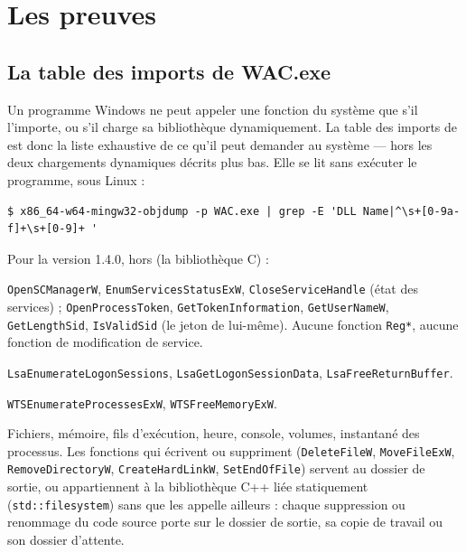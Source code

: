 \documentclass[11pt,a4paper,oneside]{report}
\begin{document}
\chapter{Les preuves}\label{ch:preuves}

\section{La table des imports de WAC.exe}

Un programme Windows ne peut appeler une fonction du système que s'il
l'importe, ou s'il charge sa bibliothèque dynamiquement. La table des imports
de  est donc la liste exhaustive de ce qu'il peut demander au
système — hors les deux chargements dynamiques décrits plus bas. Elle se lit
sans exécuter le programme, sous Linux :

\begin{lstlisting}
$ x86_64-w64-mingw32-objdump -p WAC.exe | grep -E 'DLL Name|^\s+[0-9a-f]+\s+[0-9]+ '
\end{lstlisting}

Pour la version 1.4.0, hors  (la bibliothèque C) :

\begin{description}[style=nextline,leftmargin=1.2em]
  \item[ADVAPI32.dll] \texttt{OpenSCManagerW}, \texttt{EnumServicesStatusExW},
    \texttt{CloseServiceHandle} (état des services) ; \texttt{OpenProcessToken},
    \texttt{GetTokenInformation}, \texttt{GetUserNameW}, \texttt{GetLengthSid},
    \texttt{IsValidSid} (le jeton de \wac{} lui-même). Aucune fonction
    \texttt{Reg*}, aucune fonction de modification de service.
  \item[Secur32.dll] \texttt{LsaEnumerateLogonSessions},
    \texttt{LsaGetLogonSessionData}, \texttt{LsaFreeReturnBuffer}.
  \item[WTSAPI32.dll] \texttt{WTSEnumerateProcessesExW},
    \texttt{WTSFreeMemoryExW}.
  \item[KERNEL32.dll] Fichiers, mémoire, fils d'exécution, heure, console,
    volumes, instantané des processus. Les fonctions qui écrivent ou
    suppriment (\texttt{DeleteFileW}, \texttt{MoveFileExW},
    \texttt{RemoveDirectoryW}, \texttt{CreateHardLinkW}, \texttt{SetEndOfFile})
    servent au dossier de sortie, ou appartiennent à la bibliothèque C++ liée
    statiquement (\texttt{std::filesystem}) sans que \wac{} les appelle
    ailleurs : chaque suppression ou renommage du code source porte sur le
    dossier de sortie, sa copie de travail ou son dossier d'attente.
\end{description}
\end{document}
